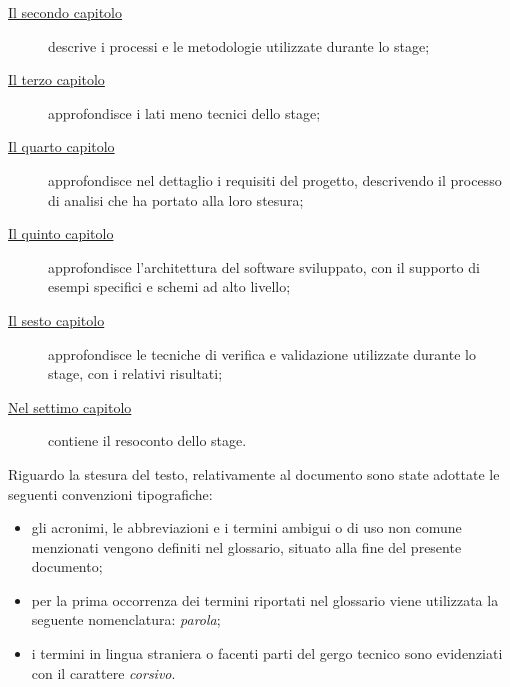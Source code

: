 \begin{description}
    \item[{\hyperref[cap:processi-metodologie]{Il secondo capitolo}}] descrive i processi e le metodologie utilizzate durante lo stage;
    
    \item[{\hyperref[cap:descrizione-stage]{Il terzo capitolo}}] approfondisce i lati meno tecnici dello stage; 
    
    \item[{\hyperref[cap:analisi-requisiti]{Il quarto capitolo}}] approfondisce nel dettaglio i requisiti del progetto, descrivendo il processo di analisi che ha portato alla loro stesura;
    
    \item[{\hyperref[cap:progettazione-codifica]{Il quinto capitolo}}] approfondisce l'architettura del software sviluppato, con il supporto di esempi specifici e schemi ad alto livello;
    
    \item[{\hyperref[cap:verifica-validazione]{Il sesto capitolo}}] approfondisce le tecniche di verifica e validazione utilizzate durante lo stage, con i relativi risultati;
    
    \item[{\hyperref[cap:conclusioni]{Nel settimo capitolo}}] contiene il resoconto dello stage. 
\end{description}

Riguardo la stesura del testo, relativamente al documento sono state adottate le seguenti convenzioni tipografiche:
\begin{itemize}
	\item gli acronimi, le abbreviazioni e i termini ambigui o di uso non comune menzionati vengono definiti nel glossario, situato alla fine del presente documento;
	\item per la prima occorrenza dei termini riportati nel glossario viene utilizzata la seguente nomenclatura: \emph{parola}\glsfirstoccur;
	\item i termini in lingua straniera o facenti parti del gergo tecnico sono evidenziati con il carattere \emph{corsivo}.
\end{itemize}